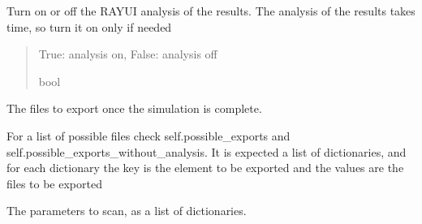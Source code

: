 \documentclass[letterpaper,10pt,english]{sphinxmanual}
\begin{document}
\begin{fulllineitems}
\begin{quote}
\begin{description}
\end{description}\end{quote}

\begin{fulllineitems}
\label{\detokenize{API:raypyng.simulate.Simulate.analyze}}
\pysigstartsignatures
{}
\pysigstopsignatures
\sphinxAtStartPar
Turn on or off the RAY\sphinxhyphen{}UI analysis of the results.
The analysis of the results takes time, so turn it on only if needed
\begin{quote}\begin{description}
\sphinxAtStartPar
True: analysis on, False: analysis off

\sphinxAtStartPar
bool

\end{description}\end{quote}

\end{fulllineitems}


\begin{fulllineitems}
\label{\detokenize{API:raypyng.simulate.Simulate.exports}}
\pysigstartsignatures
{}
\pysigstopsignatures
\sphinxAtStartPar
The files to export once the simulation is complete.

\sphinxAtStartPar
For a list of possible files check self.possible\_exports
and self.possible\_exports\_without\_analysis.
It is expected a list of dictionaries, and for each dictionary
the key is the element to be exported and the values are
the files to be exported

\end{fulllineitems}


\begin{fulllineitems}
\label{\detokenize{API:raypyng.simulate.Simulate.params}}
\pysigstartsignatures
{}
\pysigstopsignatures
\sphinxAtStartPar
The parameters to scan, as a list of dictionaries.


\end{fulllineitems}
\end{fulllineitems}
\end{document}
